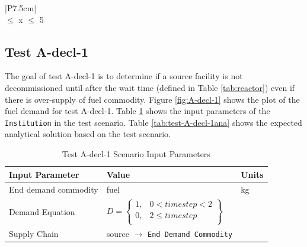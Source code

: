 \documentclass[11pt,letterpaper]{article}
\begin{document}
\begin{table}[H]
	\centering
	\caption{Test A-grow-1 Base Test Acceptance}
	\label{tab:test-A-grow-1base}
	\begin{tabular}{|P{7.5cm}|}
		\hline
		\textbf{}\\
		 $\leq$ x $\leq$ 5 \\
		\hline
	\end{tabular}
\end{table}

\subsection{Test A-decl-1}
The goal of test A-decl-1 is to determine if a source facility is not decommissioned until after the wait time (defined in Table \ref{tab:reactor}) even if there is over-supply of fuel commodity. Figure \ref{fig:A-decl-1} shows the plot of the fuel demand for test A-decl-1. 
Table \ref{tab:test-A-decl-1} shows the input parameters of the \texttt{Institution} in the test scenario. Table \ref{tab:test-A-decl-1ana} shows the expected analytical solution based on the test scenario. 

\begin{table}[H]
	\centering
	\caption{Test A-decl-1 Scenario Input Parameters }
	\label{tab:test-A-decl-1}
	\begin{tabular}{|l|l|l|}
		\hline
		\textbf{Input Parameter} & \textbf{Value} & \textbf{Units} \\
		\hline
		End demand commodity & fuel & kg \\
		Demand Equation & $D = \left\{
		\begin{array}{ll}
			1 , & 0 < timestep < 2 \\
			0 , &  2 \leq timestep  \\
		\end{array}\right\}$
		& \\
		Supply Chain & source $\rightarrow$ \texttt{End Demand Commodity} &  \\
		\hline
		\end{tabular}
\end{table}
\end{document}
